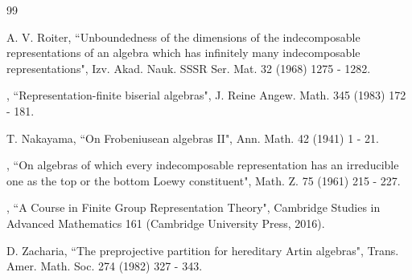 \documentclass[10pt]{amsart}
\theoremstyle{definition}
\begin{document}
\begin{thebibliography}{99}

 {\sc A. V. Roiter}, ``Unboundedness of the dimensions of the indecomposable representations of an algebra which has infinitely many indecomposable representations", Izv. Akad. Nauk. SSSR Ser. Mat. 32 (1968) 1275 - 1282.

, ``Representation-finite biserial algebras", J. Reine Angew. Math. 345 (1983) 172 - 181. 

 {\sc T. Nakayama}, ``On Frobeniusean algebras II", Ann. Math. 42 (1941) 1 - 21. 


, ``On algebras of which every indecomposable 
representation has an irreducible one as the top or the bottom Loewy constituent", Math. Z. 75 (1961) 215 - 227.

, ``A Course in Finite Group Representation Theory", Cambridge Studies in Advanced Mathematics 161 (Cambridge University Press, 2016).

 D. Zacharia, ``The preprojective partition for hereditary Artin algebras", Trans. Amer. Math. Soc. 274 (1982) 327 - 343.

\vspace{2pt} 

\end{thebibliography}
\end{document}
